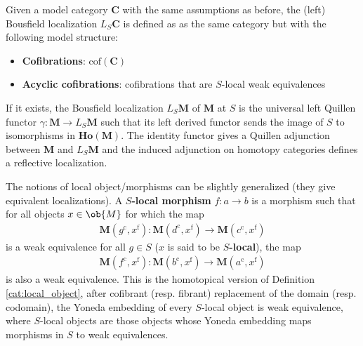     \begin{construct}
        Given a model category $\mathbf{C}$ with the same assumptions as before, the (left) Bousfield localization $L_S\mathbf{C}$ is defined as as the same category but with the following model structure:
        \begin{itemize}
            \item\textbf{Cofibrations}: $\mathrm{cof}(\mathbf{C})$
            \item\textbf{Acyclic cofibrations}: cofibrations that are $S$-local weak equivalences
        \end{itemize}
        If it exists, the Bousfield localization $L_S\mathbf{M}$ of $\mathbf{M}$ at $S$ is the universal left Quillen functor $\gamma:\mathbf{M}\rightarrow L_S\mathbf{M}$ such that its left derived functor sends the image of $S$ to isomorphisms in $\mathbf{Ho}(\mathbf{M})$. The identity functor gives a Quillen adjunction between $\mathbf{M}$ and $L_S\mathbf{M}$ and the induced adjunction on homotopy categories defines a reflective localization.
    \end{construct}
    \begin{remark}
        The notions of local object/morphisms can be slightly generalized (they give equivalent localizations). A \textbf{$S$-local morphism} $f:a\rightarrow b$ is a morphism such that for all objects $x\in\ob{M}$ for which the map
        \begin{gather}
            \mathbf{M}(g^\mathrm{c},x^\mathrm{f}):\mathbf{M}(d^\mathrm{c},x^\mathrm{f})\rightarrow\mathbf{M}(c^\mathrm{c},x^\mathrm{f})
        \end{gather}
        is a weak equivalence for all $g\in S$ ($x$ is said to be \textbf{$S$-local}), the map
        \begin{gather}
            \mathbf{M}(f^\mathrm{c},x^\mathrm{f}):\mathbf{M}(b^\mathrm{c},x^\mathrm{f})\rightarrow\mathbf{M}(a^\mathrm{c},x^\mathrm{f})
        \end{gather}
        is also a weak equivalence. This is the homotopical version of Definition \ref{cat:local_object}, after cofibrant (resp. fibrant) replacement of the domain (resp. codomain), the Yoneda embedding of every $S$-local object is weak equivalence, where $S$-local objects are those objects whose Yoneda embedding maps morphisms in $S$ to weak equivalences.
    \end{remark}


